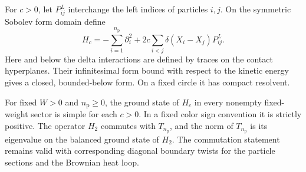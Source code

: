 For $c>0$, let $P^L_{ij}$ interchange the left indices of particles $i,j$.
On the symmetric Sobolev form domain define
\begin{equation}
 H_c=-\sum_{i=1}^{n_{\mathrm p}}\partial_i^2
       +2c\sum_{i<j}\delta(X_i-X_j)P^L_{ij}.
 \label{eq:B2}
\end{equation}
Here and below the delta interactions are defined by traces on the contact
hyperplanes.  Their infinitesimal form bound with respect to the kinetic
energy gives a closed, bounded-below form.  On a fixed circle it has compact
resolvent.

\begin{lemma}
\label{lem:brownian-ground}
For fixed $W>0$ and $n_{\mathrm p}\ge0$, the ground state of $H_c$ in every
nonempty fixed-weight sector is simple for each $c>0$.  In a fixed color
sign convention it is strictly positive.  The operator $H_2$ commutes with
$T_{n_{\mathrm p}}$, and the norm of $T_{n_{\mathrm p}}$ is its eigenvalue
on the balanced ground state of $H_2$.
The commutation statement remains valid with corresponding diagonal
boundary twists for the particle sections and the Brownian heat loop.
\end{lemma}

